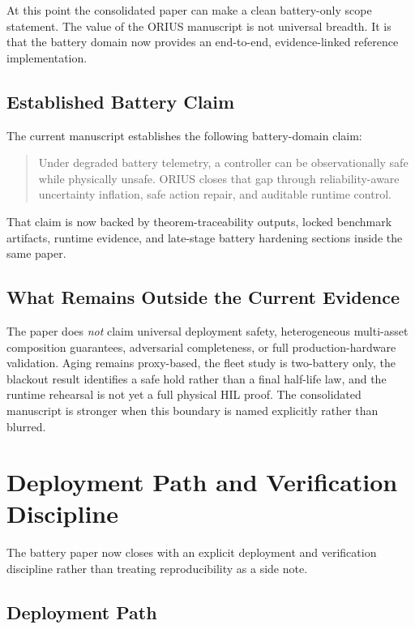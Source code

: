 At this point the consolidated paper can make a clean battery-only scope
statement.  The value of the ORIUS manuscript is not universal breadth.  It
is that the battery domain now provides an end-to-end, evidence-linked
reference implementation.

\subsection{Established Battery Claim}

The current manuscript establishes the following battery-domain claim:

\begin{quote}
Under degraded battery telemetry, a controller can be observationally safe
while physically unsafe.  ORIUS closes that gap through reliability-aware
uncertainty inflation, safe action repair, and auditable runtime control.
\end{quote}

That claim is now backed by theorem-traceability outputs, locked benchmark
artifacts, runtime evidence, and late-stage battery hardening sections inside
the same paper.

\subsection{What Remains Outside the Current Evidence}

The paper does \emph{not} claim universal deployment safety, heterogeneous
multi-asset composition guarantees, adversarial completeness, or full
production-hardware validation.  Aging remains proxy-based, the fleet study is
two-battery only, the blackout result identifies a safe hold rather than a
final half-life law, and the runtime rehearsal is not yet a full physical HIL
proof.  The consolidated manuscript is stronger when this boundary is named
explicitly rather than blurred.

\section{Deployment Path and Verification Discipline}\label{sec:deployment_discipline}

The battery paper now closes with an explicit deployment and verification
discipline rather than treating reproducibility as a side note.

\subsection{Deployment Path}

